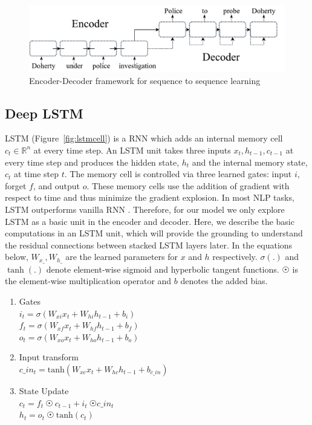 \begin{figure}
    \centering
    \includegraphics[scale=0.5]{figures/paraphrase/seq2seq.pdf}
    \caption[Sequence to Sequence Learning]{Encoder-Decoder framework for sequence to sequence learning}
    \label{fig:enc_dec}
\end{figure}
 
\subsection{Deep LSTM}
LSTM (Figure~\ref{fig:lstmcell}) is a RNN which adds an internal memory cell $c_t \! \in \! \mathbb{R}^n$ at every time step. An LSTM unit takes three inputs $x_t,h_{t-1},c_{t-1}$ at every time step and produces the hidden state, $h_t$ and the internal memory state, $c_t$ at time step $t$. The memory cell is controlled via three learned gates: input $i$, forget $f$, and output $o$. These memory cells use the addition of gradient with respect to time and thus minimize the gradient explosion. In most NLP tasks, LSTM outperforms vanilla RNN \cite{sundermeyer2012lstm}. Therefore, for our model we only explore LSTM as a basic unit in the encoder and decoder. Here, we describe the basic computations in an LSTM unit, which will provide the grounding to understand the residual connections between stacked LSTM layers later.
In the equations below, $W_{x\_}, W_{h\_}$ are the learned parameters for $x$ and $h$ respectively. $\sigma(.)$ and $\tanh(.)$ denote element-wise sigmoid and hyperbolic tangent functions. $\astrosun$ is the element-wise multiplication operator and $b$ denotes the added bias.

\begin{enumerate}
  \item Gates \\
        \(\displaystyle   i_{t} = \sigma(W_{xi}x_{t} + W_{hi}h_{t-1} + b_{i}) \) \\
        \(\displaystyle   f_{t} = \sigma(W_{xf}x_{t} + W_{hf}h_{t-1} + b_{f}) \) \\
        \(\displaystyle   o_{t} = \sigma(W_{xo}x_{t} + W_{ho}h_{t-1} + b_{o}) \) 
  \item Input transform \\
        \(\displaystyle    c\_in_{t} = \textrm{tanh}(W_{xc}x_{t} + W_{hc}h_{t-1} + b_{c\_in})  \) 
  \item State Update \\
        \(\displaystyle    c_{t} = f_{t} \ \astrosun \ c_{t-1} + i_{t} \ \astrosun c\_in_{t} \) \\
        \(\displaystyle    h_{t} = o_{t} \ \astrosun \ \textrm{tanh}(c_{t}) \) 
 
\end{enumerate}

